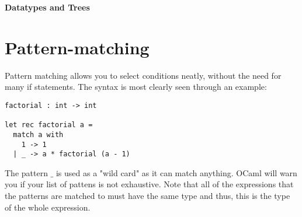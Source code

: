 \documentclass[12pt]{article}
\begin{document}
\begin{center}\LARGE\bf
    Datatypes and Trees
\end{center}

\section{Pattern-matching}
Pattern matching allows you to select conditions neatly, without the need for many if statements. The
syntax is most clearly seen through an example:
\begin{lstlisting}
factorial : int -> int

let rec factorial a =
  match a with
    1 -> 1
  | _ -> a * factorial (a - 1)
\end{lstlisting}
The pattern $\_$ is used as a "wild card" as it can match anything. OCaml will warn you if your list of pattens is not
exhaustive. Note that all of the expressions that the patterns are matched to must have the same type and
thus, this is the type of the whole expression.
\end{document}
